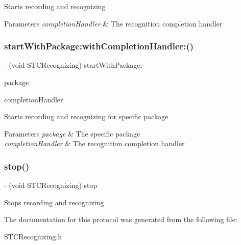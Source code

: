 Starts recording and recognizing 
\begin{DoxyParams}{Parameters}
{\em completion\+Handler} & The recognition completion handler \\
\hline
\end{DoxyParams}
\hypertarget{protocol_s_t_c_recognizing_01-p_af680d307ec5cb7c13486114a50149b3b}{}\label{protocol_s_t_c_recognizing_01-p_af680d307ec5cb7c13486114a50149b3b} 
\subsubsection{\texorpdfstring{start\+With\+Package\+:with\+Completion\+Handler\+:()}{startWithPackage:withCompletionHandler:()}}
{\footnotesize\ttfamily -\/ (void S\+T\+C\+Recognizing) start\+With\+Package\+: \begin{DoxyParamCaption}\item[{(N\+S\+String $\ast$)}]{package }\item[{withCompletionHandler:(Recognizing\+Completion\+Handler)}]{completion\+Handler }\end{DoxyParamCaption}}

Starts recording and recognizing for specific package 
\begin{DoxyParams}{Parameters}
{\em package} & The specific package \\
\hline
{\em completion\+Handler} & The recognition completion handler \\
\hline
\end{DoxyParams}
\hypertarget{protocol_s_t_c_recognizing_01-p_a8654bee0d2c8cdea7df905605b7522f8}{}\label{protocol_s_t_c_recognizing_01-p_a8654bee0d2c8cdea7df905605b7522f8} 
\subsubsection{\texorpdfstring{stop()}{stop()}}
{\footnotesize\ttfamily -\/ (void S\+T\+C\+Recognizing) stop \begin{DoxyParamCaption}{ }\end{DoxyParamCaption}}

Stops recording and recognizing 

The documentation for this protocol was generated from the following file\+:\begin{DoxyCompactItemize}
\item 
S\+T\+C\+Recognizing.\+h\end{DoxyCompactItemize}
